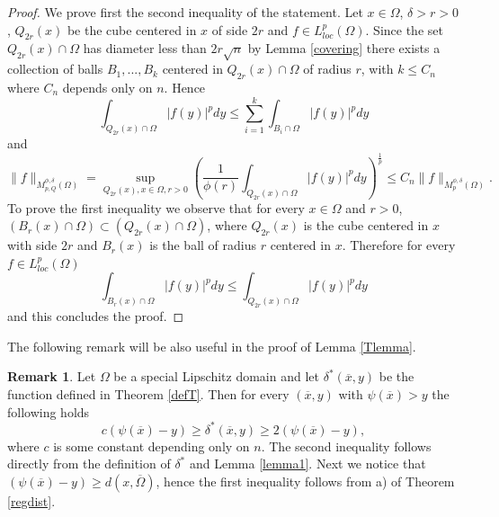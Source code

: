 \documentclass[12pt]{article}
\theoremstyle{definition}
\newtheorem{remark}{Remark}
\begin{document}
\begin{proof}
We prove first the second inequality of the statement. Let $x \in \Omega$, $\delta>r>0$, $Q_{2r}(x)$ be the cube centered in $x$ of side $2r$ and $f \in L^p_{loc}(\Omega)$. Since the set $Q_{2r}(x) \cap \Omega$ has diameter less than $2r\sqrt n$ by Lemma \ref{covering} there exists a collection of balls $B_1,...,B_k$ centered in $Q_{2r}(x) \cap \Omega$ of radius $r$, with $k\le C_n$ where $C_n$ depends only on $n.$ Hence 
\[ 	\int_{Q_{2r}(x)\cap\Omega} |f(y)|^p dy \le \sum_{i=1}^k \int_{B_i\cap\Omega} |f(y)|^p dy\]
and
\[ \| f\|_{M_{p,Q}^{\phi,\delta}(\Omega)}=\sup_{Q_{2r}(x) ,x \in \Omega,r>0} \left( \frac{1}{\phi(r)}\int_{Q_{2r}(x)\cap\Omega} |f(y)|^p dy \right)^{\frac{1}{p}} \le C_n \| f\|_{M_p^{\phi,\delta}(\Omega)}.\]
To prove the first inequality we observe that for every $x \in \Omega$ and $r>0$, $(B_r(x)\cap\Omega)\subset (Q_{2r}(x)\cap\Omega)$, where $Q_{2r}(x)$ is the cube centered in $x$ with side $2r$ and $B_r(x)$ is the ball of radius $r$ centered in $x$. Therefore for every $f \in L^p_{loc}(\Omega)$
\[ \int_{B_r(x)\cap\Omega} |f(y)|^p dy \le \int_{Q_{2r}(x)\cap\Omega} |f(y)|^p dy\]
and this concludes the proof.

\end{proof}
The following remark will be also useful in the proof of Lemma \ref{Tlemma}.

\begin{remark}\label{deltastar}
Let $\Omega$ be a special Lipschitz domain and let $\delta^*(\overline x, y)$ be the function defined in Theorem \ref{defT}. Then for every $(\overline x, y)$ with $\psi(\overline x)>y$ the following holds
\[c(\psi(\overline x)-y) \ge \delta^*(\overline x, y) \ge 2 (\psi(\overline x)-y), \] 
where $c$ is some constant depending only on $n.$ The second inequality follows directly from the definition of $\delta^*$ and Lemma \ref{lemma1}. Next we notice that $(\psi(\overline x)-y)\ge d(x,\overline \Omega)$, hence the first inequality follows from a) of Theorem \ref{regdist}.
\end{remark}
\end{document}
